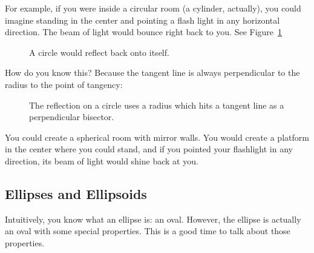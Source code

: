For example, if you were inside a circular room (a cylinder,
actually), you could imagine standing in the center and pointing a
flash light in any horizontal direction. The beam of light would
bounce right back to you. See Figure~\ref{fig:circlReflection}

\begin{figure}[htbp]
    \centering
    \caption{A circle would reflect back onto itself.}
    \label{fig:circlReflection}
\end{figure}

How do you know this?  Because the tangent line is always perpendicular to the radius to the point of tangency:
\begin{figure}[htbp]
    \centering
    \caption{The reflection on a circle uses a radius which hits a tangent line as a perpendicular bisector.}
    \label{fig:tangentCircle}
\end{figure}

You could create a spherical room with mirror walls. You would
create a platform in the center where you could stand, and if you
pointed your flashlight in any direction, its beam of light would
shine back at you.

\subsection{Ellipses and Ellipsoids}

Intuitively, you know what an ellipse is: an oval. However, the
ellipse is actually an oval with some special properties. This is a
good time to talk about those properties.

